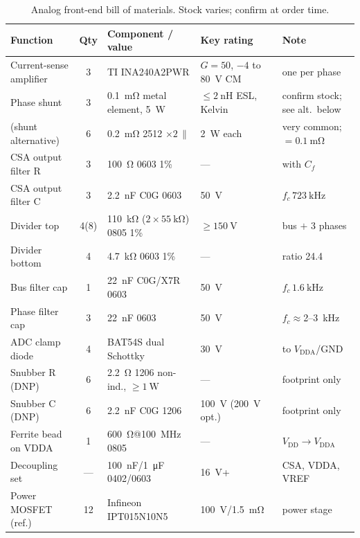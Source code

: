 \documentclass[journal,onecolumn,11pt]{IEEEtran}
\begin{document}
\begin{table}[!t]
\centering
\caption{Analog front-end bill of materials. Stock varies; confirm at order time.}
\label{tab:bom}
\small
\renewcommand{\arraystretch}{1.2}
\begin{tabularx}{\textwidth}{@{}>{\raggedright\arraybackslash}p{2.7cm} c L >{\raggedright\arraybackslash}p{2.6cm} L@{}}
\toprule
\textbf{Function} & \textbf{Qty} & \textbf{Component / value} & \textbf{Key rating} & \textbf{Note}\\
\midrule
Current-sense amplifier & 3 & TI INA240A2PWR & $G{=}50$, $-4$ to \SI{80}{\volt} CM & one per phase~\cite{lcsc}\\
Phase shunt & 3 & \SI{0.1}{\milli\ohm} metal element, \SI{5}{\watt} & $\le\SI{2}{\nano\henry}$ ESL, Kelvin & confirm stock; see alt.\ below\\
\;(shunt alternative) & 6 & \SI{0.2}{\milli\ohm} 2512 $\times2\,\parallel$ & \SI{2}{\watt} each & very common; $=\SI{0.1}{\milli\ohm}$\\
CSA output filter R & 3 & \SI{100}{\ohm} 0603 1\% & --- & with $C_f$\\
CSA output filter C & 3 & \SI{2.2}{\nano\farad} C0G 0603 & \SI{50}{\volt} & $f_c\,\SI{723}{\kilo\hertz}$\\
Divider top & 4(8) & \SI{110}{\kilo\ohm} ($2\times\SI{55}{\kilo\ohm}$) 0805 1\% & $\ge\SI{150}{\volt}$ & bus $+$ 3 phases\\
Divider bottom & 4 & \SI{4.7}{\kilo\ohm} 0603 1\% & --- & ratio \num{24.4}\\
Bus filter cap & 1 & \SI{22}{\nano\farad} C0G/X7R 0603 & \SI{50}{\volt} & $f_c\,\SI{1.6}{\kilo\hertz}$\\
Phase filter cap & 3 & \SI{22}{\nano\farad} 0603 & \SI{50}{\volt} & $f_c\approx$2--\SI{3}{\kilo\hertz}\\
ADC clamp diode & 4 & BAT54S dual Schottky & \SI{30}{\volt} & to $V_{\mathrm{DDA}}$/GND\\
Snubber R (DNP) & 6 & \SI{2.2}{\ohm} 1206 non-ind., $\ge\SI{1}{\watt}$ & --- & footprint only\\
Snubber C (DNP) & 6 & \SI{2.2}{\nano\farad} C0G 1206 & \SI{100}{\volt} (\SI{200}{\volt} opt.) & footprint only\\
Ferrite bead on VDDA & 1 & \SI{600}{\ohm}@\SI{100}{\mega\hertz} 0805 & --- & $V_{\mathrm{DD}}\!\to\!V_{\mathrm{DDA}}$\\
Decoupling set & --- & \SI{100}{\nano\farad}/\SI{1}{\micro\farad} 0402/0603 & \SI{16}{\volt}+ & CSA, VDDA, VREF\\
Power MOSFET (ref.) & 12 & Infineon IPT015N10N5 & \SI{100}{\volt}/\SI{1.5}{\milli\ohm} & power stage~\cite{lcsc}\\
\bottomrule
\end{tabularx}
\end{table}
\end{document}
